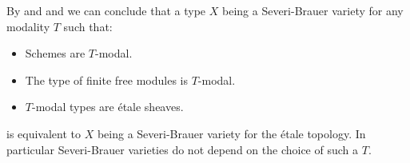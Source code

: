 \begin{remark}\label{severi-brauer-independent-modality}
By  and  and we can conclude that a type $X$ being a Severi-Brauer variety for any modality $T$ such that:
\begin{itemize}
\item Schemes are $T$-modal.
\item The type of finite free modules is $T$-modal.
\item $T$-modal types are étale sheaves.
\end{itemize}
is equivalent to $X$ being a Severi-Brauer variety for the étale topology. In particular Severi-Brauer varieties do not depend on the choice of such a $T$.
\end{remark}